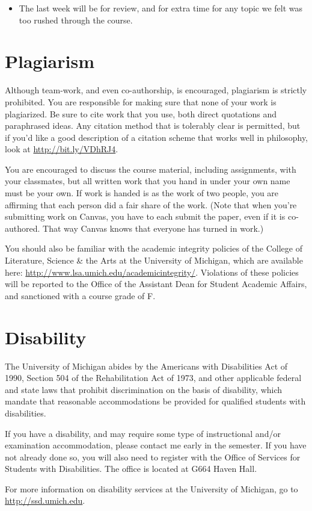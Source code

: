 \documentclass[
]{article}
\providecommand{\tightlist}{%
  \setlength{\itemsep}{0pt}\setlength{\parskip}{0pt}}\usepackage{longtable,booktabs,array}
\begin{document}
\begin{itemize}
\tightlist
\item
  The last week will be for review, and for extra time for any topic we
  felt was too rushed through the course.
\end{itemize}

\hypertarget{plagiarism}{%
\section{Plagiarism}\label{plagiarism}}

Although team-work, and even co-authorship, is encouraged, plagiarism is
strictly prohibited. You are responsible for making sure that none of
your work is plagiarized. Be sure to cite work that you use, both direct
quotations and paraphrased ideas. Any citation method that is tolerably
clear is permitted, but if you'd like a good description of a citation
scheme that works well in philosophy, look at
\url{http://bit.ly/VDhRJ4}.

You are encouraged to discuss the course material, including
assignments, with your classmates, but all written work that you hand in
under your own name must be your own. If work is handed is as the work
of two people, you are affirming that each person did a fair share of
the work. (Note that when you're submitting work on Canvas, you have to
each submit the paper, even if it is co-authored. That way Canvas knows
that everyone has turned in work.)

You should also be familiar with the academic integrity policies of the
College of Literature, Science \& the Arts at the University of
Michigan, which are available here:
\url{http://www.lsa.umich.edu/academicintegrity/}. Violations of these
policies will be reported to the Office of the Assistant Dean for
Student Academic Affairs, and sanctioned with a course grade of F.

\hypertarget{disability}{%
\section{Disability}\label{disability}}

The University of Michigan abides by the Americans with Disabilities Act
of 1990, Section 504 of the Rehabilitation Act of 1973, and other
applicable federal and state laws that prohibit discrimination on the
basis of disability, which mandate that reasonable accommodations be
provided for qualified students with disabilities.

If you have a disability, and may require some type of instructional
and/or examination accommodation, please contact me early in the
semester. If you have not already done so, you will also need to
register with the Office of Services for Students with Disabilities. The
office is located at G664 Haven Hall.

For more information on disability services at the University of
Michigan, go to \url{http://ssd.umich.edu}.
\end{document}
